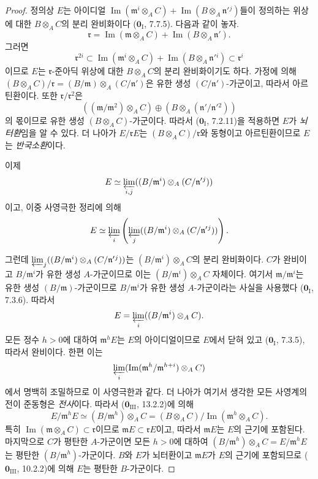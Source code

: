 \begin{proof}
정의상 $E$는 아이디얼
$\operatorname{Im}(\mathfrak m^i\otimes_A C)+
\operatorname{Im}(B\otimes_A\mathfrak n'{}^j)$들이 정의하는 위상에
대한 $B\otimes_A C$의 분리 완비화이다
($\mathbf 0_{\mathrm I}$, 7.7.5). 다음과 같이 놓자.
\[
  \mathfrak r=\operatorname{Im}(\mathfrak m\otimes_A C)+
  \operatorname{Im}(B\otimes_A\mathfrak n').
\]
그러면
\[
  \mathfrak r^{2i}\subset
  \operatorname{Im}(\mathfrak m^i\otimes_A C)+
  \operatorname{Im}(B\otimes_A\mathfrak n'{}^i)
  \subset\mathfrak r^i
\]
이므로 $E$는 $\mathfrak r$-준아딕 위상에 대한 $B\otimes_A C$의 분리
완비화이기도 하다. 가정에 의해
$(B\otimes_A C)/\mathfrak r=(B/\mathfrak m)\otimes_A
(C/\mathfrak n')$은 유한 생성 $(C/\mathfrak n')$-가군이고, 따라서
아르틴환이다. 또한 $\mathfrak r/\mathfrak r^2$은
\[
  ((\mathfrak m/\mathfrak m^2)\otimes_A C)
  \oplus(B\otimes_A(\mathfrak n'/\mathfrak n'{}^2))
\]
의 몫이므로 유한 생성 $(B\otimes_A C)$-가군이다. 따라서
($\mathbf 0_{\mathrm I}$, 7.2.11)을 적용하면 $E$가 \emph{뇌터환}임을
알 수 있다. 더 나아가 $E/\mathfrak rE$는
$(B\otimes_A C)/\mathfrak r$와 동형이고 아르틴환이므로 $E$는
\emph{반국소환}이다.

이제
\[
  E\simeq
  \varprojlim_{i,j}((B/\mathfrak m^i)\otimes_A(C/\mathfrak n'{}^j))
\]
이고, 이중 사영극한 정리에 의해
\[
  E\simeq\varprojlim_i\left(\varprojlim_j
  ((B/\mathfrak m^i)\otimes_A(C/\mathfrak n'{}^j))\right).
\]


그런데
$\varprojlim_j((B/\mathfrak m^i)\otimes_A(C/\mathfrak n'{}^j))$는
$(B/\mathfrak m^i)\otimes_A C$의 분리 완비화이다. $C$가 완비이고
$B/\mathfrak m^i$가 유한 생성 $A$-가군이므로 이는
$(B/\mathfrak m^i)\otimes_A C$ 자체이다. 여기서
$\mathfrak m/\mathfrak m^i$는 유한 생성 $(B/\mathfrak m)$-가군이므로
$B/\mathfrak m^i$가 유한 생성 $A$-가군이라는 사실을 사용했다
($\mathbf 0_{\mathrm I}$, 7.3.6). 따라서
\[
  E=\varprojlim_i((B/\mathfrak m^i)\otimes_A C).
\]
모든 정수 $h>0$에 대하여 $\mathfrak m^hE$는 $E$의 아이디얼이므로
$E$에서 닫혀 있고 ($\mathbf 0_{\mathrm I}$, 7.3.5), 따라서 완비이다.
한편 이는
\[
  \varprojlim_i
  (\operatorname{Im}(\mathfrak m^h/\mathfrak m^{h+i})\otimes_A C)
\]
에서 명백히 조밀하므로 이 사영극한과 같다. 더 나아가 여기서 생각한
모든 사영계의 전이 준동형은 \emph{전사}이다. 따라서
($\mathbf 0_{\mathrm{III}}$, 13.2.2)에 의해
\[
  E/\mathfrak m^hE\simeq(B/\mathfrak m^h)\otimes_A C
  =(B\otimes_A C)/\operatorname{Im}(\mathfrak m^h\otimes_A C).
\]
특히 $\operatorname{Im}(\mathfrak m\otimes_A C)\subset\mathfrak r$이므로
$\mathfrak mE\subset\mathfrak rE$이고, 따라서 $\mathfrak mE$는 $E$의
근기에 포함된다. 마지막으로 $C$가 평탄한 $A$-가군이면 모든 $h>0$에
대하여
$(B/\mathfrak m^h)\otimes_A C=E/\mathfrak m^hE$는 평탄한
$(B/\mathfrak m^h)$-가군이다. $B$와 $E$가 뇌터환이고
$\mathfrak mE$가 $E$의 근기에 포함되므로
($\mathbf 0_{\mathrm{III}}$, 10.2.2)에 의해 $E$는 평탄한
$B$-가군이다.
\end{proof}

